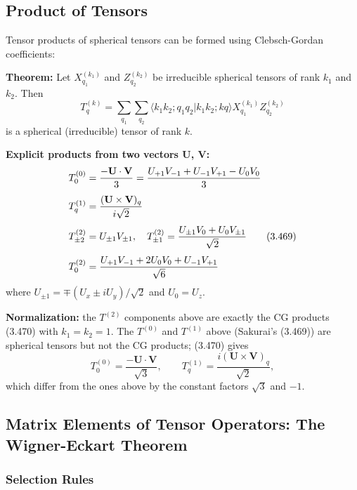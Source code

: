 \documentclass[11pt,a4paper]{article}
\begin{document}
\subsection{Product of Tensors}

Tensor products of spherical tensors can be formed using Clebsch-Gordan coefficients:

\textbf{Theorem:} Let $X_{q_1}^{(k_1)}$ and $Z_{q_2}^{(k_2)}$ be irreducible spherical tensors of rank $k_1$ and $k_2$. Then
\begin{equation}
\boxed{T_q^{(k)} = \sum_{q_1}\sum_{q_2}\langle k_1 k_2; q_1 q_2|k_1 k_2; kq\rangle X_{q_1}^{(k_1)}Z_{q_2}^{(k_2)}}
\tag{3.470}
\end{equation}
is a spherical (irreducible) tensor of rank $k$.

\textbf{Explicit products from two vectors $\mathbf{U}$, $\mathbf{V}$:}
\begin{align}
T_0^{(0)} &= \frac{-\mathbf{U}\cdot\mathbf{V}}{3} = \frac{U_{+1}V_{-1} + U_{-1}V_{+1} - U_0 V_0}{3} \notag \\[4pt]
T_q^{(1)} &= \frac{(\mathbf{U}\times\mathbf{V})_q}{i\sqrt{2}} \notag \\[4pt]
T_{\pm 2}^{(2)} &= U_{\pm 1}V_{\pm 1}, \quad T_{\pm 1}^{(2)} = \frac{U_{\pm 1}V_0 + U_0 V_{\pm 1}}{\sqrt{2}} \tag{3.469} \\[4pt]
T_0^{(2)} &= \frac{U_{+1}V_{-1} + 2U_0 V_0 + U_{-1}V_{+1}}{\sqrt{6}} \notag
\end{align}
where $U_{\pm 1} = \mp(U_x \pm iU_y)/\sqrt{2}$ and $U_0 = U_z$.

\textbf{Normalization:} the $T^{(2)}$ components above are exactly the CG products (3.470) with $k_1 = k_2 = 1$. The $T^{(0)}$ and $T^{(1)}$ above (Sakurai's (3.469)) are spherical tensors but not the CG products; (3.470) gives
$$T_0^{(0)} = \frac{-\mathbf{U}\cdot\mathbf{V}}{\sqrt{3}}, \qquad T_q^{(1)} = \frac{i(\mathbf{U}\times\mathbf{V})_q}{\sqrt{2}},$$
which differ from the ones above by the constant factors $\sqrt{3}$ and $-1$.

\subsection{Matrix Elements of Tensor Operators: The Wigner-Eckart Theorem}

\subsubsection{Selection Rules}
\end{document}
